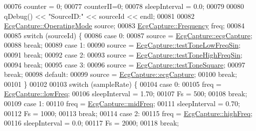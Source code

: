 \begin{DoxyCode}
00076     counter = 0;
00077     counterII=0;
00078     sleepInterval = 0.0;
00079 
00080     qDebug() << \textcolor{stringliteral}{"SourceID:"} << sourceId  << endl;
00081 
00082     \hyperlink{group__Device-Facade_gabf6e5cc9109a573e29add762dc36df9b}{EcgCapture::OperatingMode} source;
00083     \hyperlink{group__Device-Facade_gaaf4f7677ca26944edc0f65195b8729f3}{EcgCapture::Frequency} freq;
00084 
00085     \textcolor{keywordflow}{switch} (sourceId) \{
00086     \textcolor{keywordflow}{case} 0:
00087         source = \hyperlink{group__Device-Facade_ggabf6e5cc9109a573e29add762dc36df9ba9e4c8f425af52209ee3eb7c466852b22}{EcgCapture::ecgCapture};
00088         \textcolor{keywordflow}{break};
00089     \textcolor{keywordflow}{case} 1:
00090         source = \hyperlink{group__Device-Facade_ggabf6e5cc9109a573e29add762dc36df9ba9ececd6d5264a0e5996556c6697a4f94}{EcgCapture::testToneLowFreqSin};
00091         \textcolor{keywordflow}{break};
00092     \textcolor{keywordflow}{case} 2:
00093         source = \hyperlink{group__Device-Facade_ggabf6e5cc9109a573e29add762dc36df9ba397d60b89ddb5aaf41d92c617868ed47}{EcgCapture::testToneHighFreqSin};
00094         \textcolor{keywordflow}{break};
00095     \textcolor{keywordflow}{case} 3:
00096         source = \hyperlink{group__Device-Facade_ggabf6e5cc9109a573e29add762dc36df9ba8b349f0786d8e8247f4bc381baa51134}{EcgCapture::testToneSquare};
00097         \textcolor{keywordflow}{break};
00098     \textcolor{keywordflow}{default}:
00099         source = \hyperlink{group__Device-Facade_ggabf6e5cc9109a573e29add762dc36df9ba9e4c8f425af52209ee3eb7c466852b22}{EcgCapture::ecgCapture};
00100         \textcolor{keywordflow}{break};
00101     \}
00102 
00103     \textcolor{keywordflow}{switch} (sampleRate) \{
00104     \textcolor{keywordflow}{case} 0:
00105         freq = \hyperlink{group__Device-Facade_ggaaf4f7677ca26944edc0f65195b8729f3acb281025a93800e7ed188605a7375838}{EcgCapture::lowFreq};
00106         sleepInterval = 1.70;
00107         Fs = 500;
00108         \textcolor{keywordflow}{break};
00109     \textcolor{keywordflow}{case} 1:
00110         freq = \hyperlink{group__Device-Facade_ggaaf4f7677ca26944edc0f65195b8729f3a2a968734e734a271ef5a52b83360122a}{EcgCapture::midFreq};
00111         sleepInterval = 0.70;
00112         Fs = 1000;
00113         \textcolor{keywordflow}{break};
00114     \textcolor{keywordflow}{case} 2:
00115         freq = \hyperlink{group__Device-Facade_ggaaf4f7677ca26944edc0f65195b8729f3abd09d184c2c34f227532a8bc5fb90877}{EcgCapture::highFreq};
00116         sleepInterval = 0.0;
00117         Fs = 2000;
00118         \textcolor{keywordflow}{break};

\end{DoxyCode}
